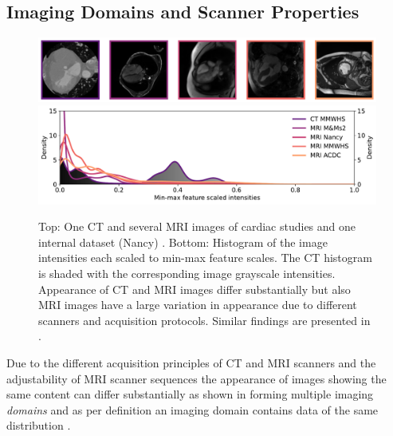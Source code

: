     \subsection{Imaging Domains and Scanner Properties} %
        \label{sec:imaging_domains}
        \begin{figure}
            \begin{minipage}{\textwidth}
                \centering
                \includegraphics[width=.89\textwidth]{sections/02_background/figures/contrast_imgs.pdf}
                \includegraphics[width=\textwidth]{sections/02_background/figures/contrast_histograms.pdf}
                \caption{Top: One \ac{CT} and several \ac{MRI} images of cardiac studies and one internal dataset (Nancy) \citep{zhuang2019evaluation,martin2023deep,
                campello2021multi,bernard2018deep}. Bottom: Histogram of the image intensities each scaled to min-max feature scales. The \ac{CT} histogram is shaded with the corresponding image grayscale intensities. Appearance of \ac{CT} and \ac{MRI} images differ substantially but also \ac{MRI} images have a large variation in appearance due to different scanners and acquisition protocols. Similar findings are presented in \citep{guan2021domain}.}
                \label{fig:domain_contrast}
            \end{minipage}
        \end{figure}

        Due to the different acquisition principles of \ac{CT} and \ac{MRI} scanners and the adjustability of \ac{MRI} scanner sequences the appearance of images showing the same content can differ substantially as shown in  forming multiple imaging \emph{domains} and as per definition an imaging domain contains data of the same distribution \citep{wang2022generalizing}.

